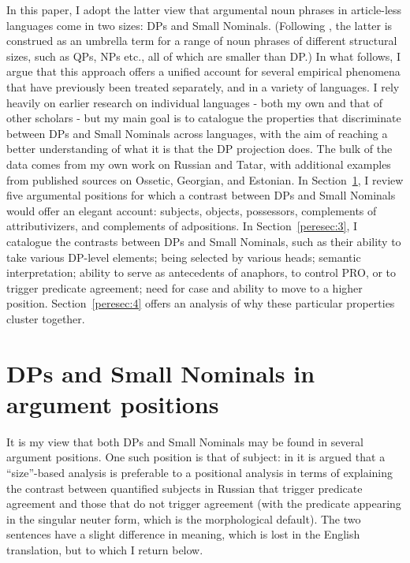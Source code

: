 \documentclass[output=paper]{langsci/langscibook}
\begin{document}
In this paper, I adopt the latter view that argumental noun phrases in article-less languages come in two sizes: 
DPs and Small Nominals. 
(Following \citealt{Pereltsvaig2006}, the latter is construed as an umbrella term for a range of noun phrases of different structural sizes, 
such as QPs, NPs etc., all of which are smaller than DP.) 
In what follows, I argue that this approach offers a unified account for several empirical phenomena that have previously been treated separately, 
and in a variety of languages. 
I rely heavily on earlier research on individual languages - both my own and that of other scholars - but my main goal is to catalogue the properties that discriminate between DPs and Small Nominals across languages, 
with the aim of reaching a better understanding of what it is that the DP projection does. 
The bulk of the data comes from my own work on Russian and Tatar, with additional examples from published sources on Ossetic, Georgian, and Estonian. 
In Section~\ref{peresec:2}, I review five argumental positions for which a contrast between DPs and Small Nominals would offer an elegant account: 
subjects, objects, possessors, complements of attributivizers, and complements of adpositions. 
In Section~\ref{peresec:3}, I catalogue the contrasts between DPs and Small Nominals, such as their ability to take various DP-level elements; 
being selected by various heads; 
semantic interpretation; 
ability to serve as antecedents of anaphors, to control PRO, or to trigger predicate agreement; 
need for case and ability to move to a higher position. 
Section~\ref{peresec:4} offers an analysis of why these particular properties cluster together.

\section{DPs and Small Nominals in argument positions}
\label{peresec:2}

It is my view that both DPs and Small Nominals may be found in several argument positions. 
One such position is that of subject: 
in \citet{Pereltsvaig2006} it is argued that a ``size''-based analysis is preferable to a positional analysis 
in terms of explaining the contrast between quantified subjects in Russian that trigger predicate agreement and those that do not trigger agreement 
(with the predicate appearing in the singular neuter form, which is the morphological default). 
The two sentences have a slight difference in meaning, which is lost in the English translation, but to which I return below.
\end{document}
